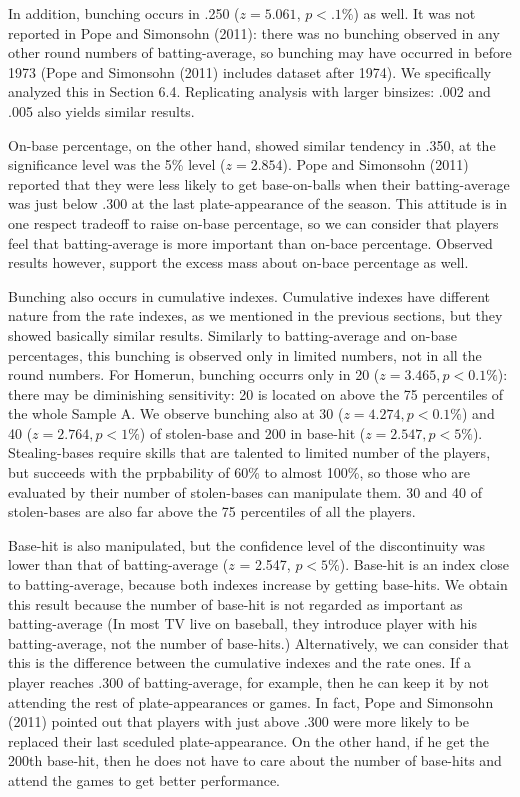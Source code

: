 \documentclass[dvipdfmx, 12pt]{article}
\begin{document}
In addition, bunching occurs in .250 ($z = 5.061$, $p < .1\%$) as well. It was not reported in Pope and Simonsohn (2011): there was no bunching observed in any other round numbers of batting-average, so bunching may have occurred in before 1973 (Pope and Simonsohn (2011) includes dataset after 1974). We specifically analyzed this in Section 6.4. Replicating analysis with larger binsizes: .002 and .005 also yields similar results.

On-base percentage, on the other hand, showed similar tendency in .350, at the significance level was the 5\% level ($z=2.854$). Pope and Simonsohn (2011) reported that they were less likely to get base-on-balls when their batting-average was just below .300 at the last plate-appearance of the season. This attitude is in one respect tradeoff to raise on-base percentage, so we can consider that players feel that batting-average is more important than on-bace percentage. Observed results however, support the excess mass about on-bace percentage as well.

Bunching also occurs in cumulative indexes. Cumulative indexes have different nature from the rate indexes, as we mentioned in the previous sections, but they showed basically similar results. Similarly to batting-average and on-base percentages, this bunching is observed only in limited numbers, not in all the round numbers. For Homerun, bunching occurrs only in 20 ($z=3.465, p < 0.1\%$): there may be diminishing sensitivity: 20 is located on above the 75 percentiles of the whole Sample A. We observe bunching also at 30 ($z=4.274, p < 0.1\%$) and 40 ($z=2.764, p < 1\%$) of stolen-base and 200 in base-hit ($z=2.547, p < 5\%$). Stealing-bases require skills that are talented to limited number of the players, but succeeds with the prpbability of 60\% to almost 100\%, so those who are evaluated by their number of stolen-bases can manipulate them. 30 and 40 of stolen-bases are also far above the 75 percentiles of all the players.

Base-hit is also manipulated, but the confidence level of the discontinuity was lower than that of batting-average ($z$ = 2.547, $p < 5\%$). Base-hit is an index close to batting-average, because both indexes increase by getting base-hits. We obtain this result because the number of base-hit is not regarded as important as batting-average (In most TV live on baseball, they introduce player with his batting-average, not the number of base-hits.) Alternatively, we can consider that this is the difference between the cumulative indexes and the rate ones. If a player reaches .300 of batting-average, for example, then he can keep it by not attending the rest of plate-appearances or games. In fact, Pope and Simonsohn (2011) pointed out that players with just above .300 were more likely to be replaced their last sceduled plate-appearance. On the other hand, if he get the 200th base-hit, then he does not have to care about the number of base-hits and attend the games to get better performance.
\end{document}

